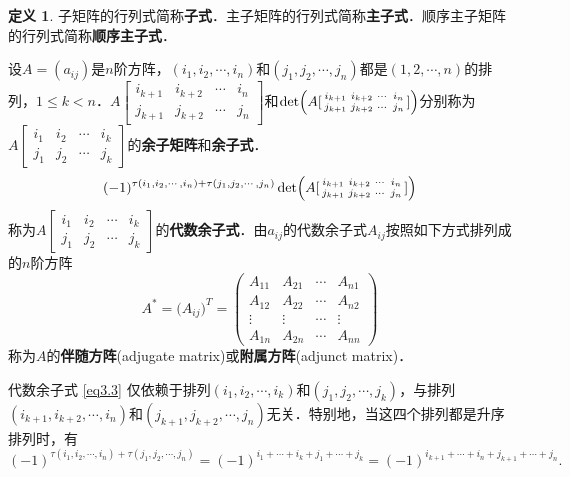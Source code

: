 \documentclass[a4paper,fontset=windows]{ctexbook}
\theoremstyle{definition}
\newtheorem{definition}{定义}[chapter]
\def\note{\noindent\raisebox{10pt}{\dbend}\hspace{7pt}}
\renewcommand{\le}{\leqslant}
\begin{document}
\begin{definition}\label{def3.3}
子矩阵的行列式简称{\bf 子式}．主子矩阵的行列式简称{\bf 主子式}．顺序主子矩阵的行列式简称{\bf 顺序主子式}．

设$A=(a_{ij})$是$n$阶方阵，$(i_1,i_2,\cdots,i_n)$和$(j_1,j_2,\cdots,j_n)$都是$(1,2,\cdots,n)$的排列，$1\le k<n$．$A[\begin{smallmatrix}i_{k+1}&i_{k+2}&\cdots&i_n \\ j_{k+1}&j_{k+2}&\cdots&j_n\end{smallmatrix}]$和$\det\Bigl(A[\begin{smallmatrix}i_{k+1}&i_{k+2}&\cdots&i_n \\ j_{k+1}&j_{k+2}&\cdots&j_n\end{smallmatrix}]\Bigr)$分别称为$A[\begin{smallmatrix}i_1&i_2&\cdots&i_k \\ j_1&j_2&\cdots&j_k\end{smallmatrix}]$的{\bf 余子矩阵}和{\bf 余子式}．
\begin{equation}\label{eq3.3}
(-1)^{\tau(i_1,i_2,\cdots,i_n)+\tau(j_1,j_2,\cdots,j_n)}\det\Bigl(A[\begin{smallmatrix}i_{k+1}&i_{k+2}&\cdots&i_n \\ j_{k+1}&j_{k+2}&\cdots&j_n\end{smallmatrix}]\Bigr)
\end{equation}
称为$A[\begin{smallmatrix}i_1&i_2&\cdots&i_k \\ j_1&j_2&\cdots&j_k\end{smallmatrix}]$的{\bf 代数余子式}．由$a_{ij}$的代数余子式$A_{ij}$按照如下方式排列成的$n$阶方阵
$$A^*=\bigl(A_{ij}\bigr)^T=\begin{pmatrix}A_{11}&A_{21}&\cdots&A_{n1} \\ A_{12}&A_{22}&\cdots&A_{n2} \\ \vdots&\vdots&\cdots&\vdots \\ A_{1n}&A_{2n}&\cdots&A_{nn}\end{pmatrix}$$
称为$A$的{\bf 伴随方阵}(adjugate matrix)或{\bf 附属方阵}(adjunct matrix)．
\end{definition}

\note 代数余子式 \eqref{eq3.3} 仅依赖于排列$(i_1,i_2,\cdots,i_k)$和$(j_1,j_2,\cdots,j_k)$，与排列$(i_{k+1},i_{k+2},\cdots,i_n)$和$(j_{k+1},j_{k+2},\cdots,j_n)$无关．特别地，当这四个排列都是升序排列时，有
$$(-1)^{\tau(i_1,i_2,\cdots,i_n)+\tau(j_1,j_2,\cdots,j_n)}=(-1)^{i_1+\cdots+i_k+j_1+\cdots+j_k}=(-1)^{i_{k+1}+\cdots+i_n+j_{k+1}+\cdots+j_n}.$$
\end{document}
